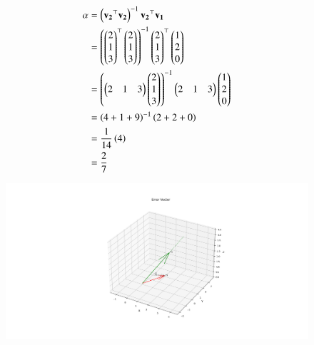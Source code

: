 \documentclass[journal]{IEEEtran}
\begin{document}
     \begin{align}
\alpha&=\left(\mathbf{v_2}^\top\mathbf{v_2}\right)^{-1}\mathbf{v_2}^\top\mathbf{v_1} \\
    &= \left(\begin{pmatrix}2\\1\\3\end{pmatrix}^\top\begin{pmatrix}2\\1\\3\end{pmatrix}\right)^{-1}\begin{pmatrix}2\\1\\3\end{pmatrix}^\top\begin{pmatrix}1\\2\\0\end{pmatrix} \\
     &= \left(\begin{pmatrix}2&1&3\end{pmatrix}\begin{pmatrix}2\\1\\3\end{pmatrix}\right)^{-1}\begin{pmatrix}2&1&3\end{pmatrix}\begin{pmatrix}1\\2\\0\end{pmatrix} \\
     &=\left(4+1+9\right)^{-1}\left(2+2+0\right)\\
     &=\frac{1}{14}\left(4\right)\\
     &=\frac{2}{7}
 \end{align}
 \begin{figure}[h!]
   \centering
   \includegraphics[width=1.\columnwidth]{figs/fig1.png}
	\caption{}
   \label{}
\end{figure}
 
\end{document}
